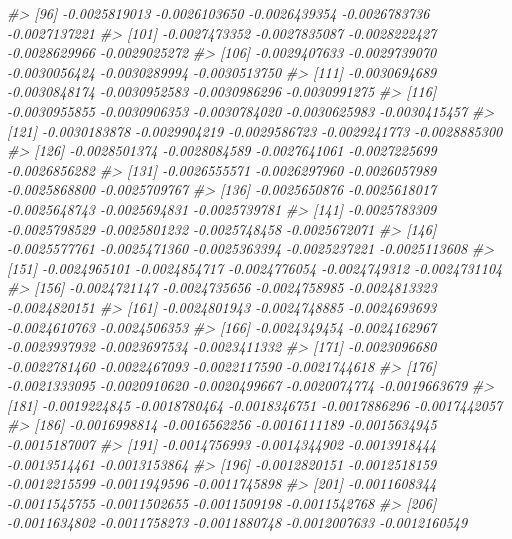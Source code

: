 \documentclass[
]{article}
\newenvironment{Shaded}{\begin{snugshade}}{\end{snugshade}}
\newcommand{\CommentTok}[1]{\textcolor[rgb]{0.56,0.35,0.01}{\textit{#1}}}
\begin{document}
\begin{Shaded}
\begin{Highlighting}[]
\CommentTok{\#\textgreater{}  [96] {-}0.0025819013 {-}0.0026103650 {-}0.0026439354 {-}0.0026783736 {-}0.0027137221}
\CommentTok{\#\textgreater{} [101] {-}0.0027473352 {-}0.0027835087 {-}0.0028222427 {-}0.0028629966 {-}0.0029025272}
\CommentTok{\#\textgreater{} [106] {-}0.0029407633 {-}0.0029739070 {-}0.0030056424 {-}0.0030289994 {-}0.0030513750}
\CommentTok{\#\textgreater{} [111] {-}0.0030694689 {-}0.0030848174 {-}0.0030952583 {-}0.0030986296 {-}0.0030991275}
\CommentTok{\#\textgreater{} [116] {-}0.0030955855 {-}0.0030906353 {-}0.0030784020 {-}0.0030625983 {-}0.0030415457}
\CommentTok{\#\textgreater{} [121] {-}0.0030183878 {-}0.0029904219 {-}0.0029586723 {-}0.0029241773 {-}0.0028885300}
\CommentTok{\#\textgreater{} [126] {-}0.0028501374 {-}0.0028084589 {-}0.0027641061 {-}0.0027225699 {-}0.0026856282}
\CommentTok{\#\textgreater{} [131] {-}0.0026555571 {-}0.0026297960 {-}0.0026057989 {-}0.0025868800 {-}0.0025709767}
\CommentTok{\#\textgreater{} [136] {-}0.0025650876 {-}0.0025618017 {-}0.0025648743 {-}0.0025694831 {-}0.0025739781}
\CommentTok{\#\textgreater{} [141] {-}0.0025783309 {-}0.0025798529 {-}0.0025801232 {-}0.0025748458 {-}0.0025672071}
\CommentTok{\#\textgreater{} [146] {-}0.0025577761 {-}0.0025471360 {-}0.0025363394 {-}0.0025237221 {-}0.0025113608}
\CommentTok{\#\textgreater{} [151] {-}0.0024965101 {-}0.0024854717 {-}0.0024776054 {-}0.0024749312 {-}0.0024731104}
\CommentTok{\#\textgreater{} [156] {-}0.0024721147 {-}0.0024735656 {-}0.0024758985 {-}0.0024813323 {-}0.0024820151}
\CommentTok{\#\textgreater{} [161] {-}0.0024801943 {-}0.0024748885 {-}0.0024693693 {-}0.0024610763 {-}0.0024506353}
\CommentTok{\#\textgreater{} [166] {-}0.0024349454 {-}0.0024162967 {-}0.0023937932 {-}0.0023697534 {-}0.0023411332}
\CommentTok{\#\textgreater{} [171] {-}0.0023096680 {-}0.0022781460 {-}0.0022467093 {-}0.0022117590 {-}0.0021744618}
\CommentTok{\#\textgreater{} [176] {-}0.0021333095 {-}0.0020910620 {-}0.0020499667 {-}0.0020074774 {-}0.0019663679}
\CommentTok{\#\textgreater{} [181] {-}0.0019224845 {-}0.0018780464 {-}0.0018346751 {-}0.0017886296 {-}0.0017442057}
\CommentTok{\#\textgreater{} [186] {-}0.0016998814 {-}0.0016562256 {-}0.0016111189 {-}0.0015634945 {-}0.0015187007}
\CommentTok{\#\textgreater{} [191] {-}0.0014756993 {-}0.0014344902 {-}0.0013918444 {-}0.0013514461 {-}0.0013153864}
\CommentTok{\#\textgreater{} [196] {-}0.0012820151 {-}0.0012518159 {-}0.0012215599 {-}0.0011949596 {-}0.0011745898}
\CommentTok{\#\textgreater{} [201] {-}0.0011608344 {-}0.0011545755 {-}0.0011502655 {-}0.0011509198 {-}0.0011542768}
\CommentTok{\#\textgreater{} [206] {-}0.0011634802 {-}0.0011758273 {-}0.0011880748 {-}0.0012007633 {-}0.0012160549}

\end{Highlighting}
\end{Shaded}
\end{document}
